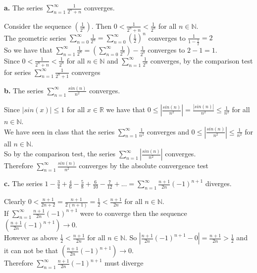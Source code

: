 \documentclass{article}
\begin{document}
{\Large \textbf{a.}} The series $\sum_{n=1}^{\infty}\frac{1}{2^n + n}$ converges.
\begin{center}
    \doublespacing
    Consider the sequence $(\frac{1}{2^n})$. Then $0 <\frac{1}{2^n + n} <\frac{1}{2^n}$ for all $n\in\mathbb{N}$.
    \\The geometric series $\sum_{n=0}^{\infty}\frac{1}{2^n} = \sum_{n=0}^{\infty} (\frac{1}{2})^n$ converges to $\frac{1}{1 - \frac{1}{2}} = 2$ 
    \\So we have that $\sum_{n=1}^{\infty}\frac{1}{2^n} = (\sum_{n=0}^{\infty}\frac{1}{2^n}) - \frac{1}{2^0}$ converges to $2 - 1 = 1$.
    \\Since $0 <\frac{1}{2^n + n} <\frac{1}{2^n}$ for all $n\in\mathbb{N}$ and $\sum_{n=1}^{\infty}\frac{1}{2^n}$ converges, by the comparison test for series $\sum_{n=1}^{\infty}\frac{1}{2^n + 1}$ converges \qedsymbol
\end{center}

{\Large \textbf{b.}} The series $\sum_{n=1}^{\infty}\frac{sin(n)}{n^2}$ converges.
\begin{center}
    \doublespacing
    Since $|sin(x)|\leq 1$ for all $x\in\mathbb{R}$ we have that $0\leq |\frac{sin(n)}{n^2}| =\frac{|sin(n)|}{n^2}\leq \frac{1}{n^2}$ for all $n\in\mathbb{N}$.
    \\We have seen in class that the series $\sum_{n=1}^{\infty}\frac{1}{n^2}$ converges and $0\leq |\frac{sin(n)}{n^2}|\leq \frac{1}{n^2}$ for all $n\in\mathbb{N}$.
    \\So by the comparison test, the series $\sum_{n=1}^{\infty} |\frac{sin(n)}{n^2}|$ converges.
    \\Therefore $\sum_{n=1}^{\infty}\frac{sin(n)}{n^2}$ converges by the absolute convergence test \qedsymbol
\end{center}

{\Large \textbf{c.}} The series $1 -\frac{3}{4} +\frac{4}{6} -\frac{5}{8} +\frac{6}{10} -\frac{7}{12} + ... = \sum _{n=1}^{\infty}\frac{n + 1}{2n} (-1)^{n+1}$ diverges.
\begin{center}
    \doublespacing
    Clearly $0 <\frac{n + 1}{2n + 2} =\frac{n + 1}{2(n + 1)} =\frac{1}{2} <\frac{n + 1}{2n}$ for all $n\in\mathbb{N}$.
    \\If $\sum _{n=1}^{\infty}\frac{n + 1}{2n} (-1)^{n+1}$ were to converge then the sequence $(\frac{n + 1}{2n} (-1)^{n+1})\rightarrow 0$.
    \\However as above $\frac{1}{2} <\frac{n + 1}{2n}$ for all $n\in\mathbb{N}$. So $|\frac{n+1}{2n}(-1)^{n+1} - 0| =\frac{n+1}{2n} >\frac{1}{2}$ and it can not be that $(\frac{n + 1}{2n} (-1)^{n+1})\rightarrow 0$.
    \\Therefore $\sum _{n=1}^{\infty}\frac{n + 1}{2n} (-1)^{n+1}$ must diverge \qedsymbol
\end{center}
\end{document}
